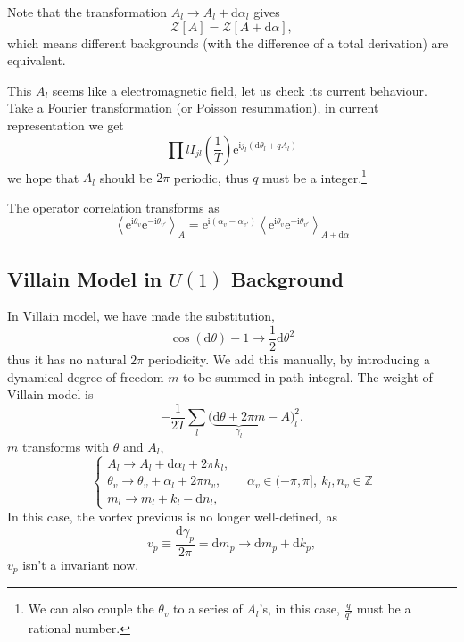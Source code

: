 Note that the transformation $A_{l} \to A_{l} + \mathrm{d} \alpha _{l}$ gives
\begin{equation}
  \mathcal{Z}[A] = \mathcal{Z}[A + \mathrm{d} \alpha],
\end{equation}
which means different backgrounds (with the difference of a total derivation) are equivalent.

This $A_l$ seems like a electromagnetic field, let us check its current behaviour. Take a Fourier transformation (or Poisson resummation), in current representation we get
\begin{equation}
  \prod{l} I_{j l} \left( \frac{1}{T} \right) \mathrm{e}^{\mathrm{i} j_{l} \left( \mathrm{d} \theta_{l} + q A_l \right)}
\end{equation}
we hope that $A_l$ should be $2 \pi $ periodic, thus $q$ must be a integer.\footnote{We can also couple the $\theta _{v}$ to a series of $A_l$'s, in this case, $\frac{q}{q'}$ must be a rational number.}

The operator correlation transforms as 
\begin{equation}
  \left< \mathrm{e}^{\mathrm{i} \theta_{v}} \mathrm{e}^{- \mathrm{i} \theta _{v'}} \right>_{A} = \mathrm{e}^{\mathrm{i} \left( \alpha _{v} - \alpha _{v'} \right) } \left< \mathrm{e}^{\mathrm{i} \theta _{v}} \mathrm{e}^{-\mathrm{i} \theta _{v'}} \right>_{A + \mathrm{d} \alpha}
\end{equation}

\subsection{Villain Model in $U(1)$ Background}
In Villain model, we have made the substitution,
\begin{equation}
  \cos (\mathrm{d} \theta) -1 \to \frac{1}{2} \mathrm{d} \theta^{2}
\end{equation}
thus it has no natural $2 \pi $ periodicity. We add this manually, by introducing a dynamical degree of freedom $m$ to be summed in path integral. The weight of Villain model is
\begin{equation}
  - \frac{1}{2T} \sum_{l} \bigl( \underbrace{\mathrm{d} \theta + 2 \pi m}_{\gamma _{l}} - A \bigr)_{l}^{2}.
\end{equation}
$m$ transforms with $\theta $ and $A_l$,
\begin{equation}
  \begin{cases}
    A_l \to A_l + \mathrm{d} \alpha _{l} + 2 \pi k_{l}, \\
    \theta_{v} \to \theta _{v} + \alpha _{l} + 2 \pi n_v, \\
    m_l \to m_l + k_l - \mathrm{d} n_l,
  \end{cases}
  \quad \alpha _{v} \in (-\pi ,\pi ],\ k_l, n_v \in \mathbb{Z}
\end{equation}
In this case, the vortex previous is no longer well-defined, as
\begin{equation}
  v_p \equiv \frac{\mathrm{d} \gamma _{p}}{2 \pi} = \mathrm{d} m_p \to \mathrm{d} m_p + \mathrm{d} k_p,
\end{equation}
$v_p$ isn't a invariant now.

